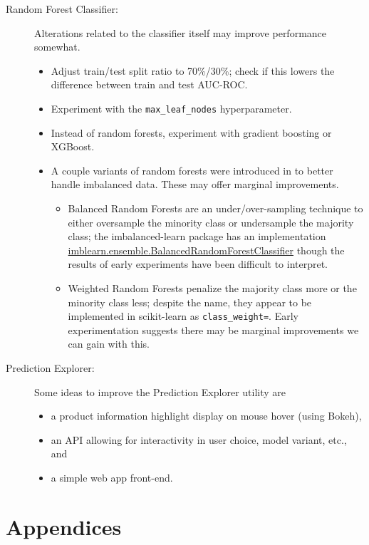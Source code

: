 \documentclass[11pt]{article}
\theoremstyle{definition}
\numberwithin{equation}{section}
\begin{document}
\begin{description}
\item[Random Forest Classifier:] Alterations related to the classifier itself may improve performance somewhat.
\begin{itemize}
\item Adjust train/test split ratio to 70\%/30\%; check if this lowers the difference between train and test AUC-ROC.
\item Experiment with the \texttt{max\_leaf\_nodes} hyperparameter.
\item Instead of random forests, experiment with gradient boosting or XGBoost.
\item A couple variants of random forests were introduced in \cite{chenUsingRandomForest2004} to better handle imbalanced data.
These may offer marginal improvements.
\begin{itemize}
\item Balanced Random Forests are an under/over-sampling technique to either 
oversample the minority class or undersample the majority class; 
the imbalanced-learn package has an implementation 
\href{https://imbalanced-learn.org/en/stable/generated/imblearn.ensemble.BalancedRandomForestClassifier.html#imblearn.ensemble.BalancedRandomForestClassifier}{imblearn.ensemble.BalancedRandomForestClassifier}
though the results of early experiments have been difficult to interpret.
\item Weighted Random Forests penalize the majority class more or the minority class less;
despite the name, they appear to be implemented in scikit-learn as 
\texttt{class\_weight=\textquotesingle{}}. Early experimentation suggests
there may be marginal improvements we can gain with this.
\end{itemize}
\end{itemize}

\item[Prediction Explorer:] Some ideas to improve the Prediction Explorer utility are
\begin{itemize}
\item a product information highlight display on mouse hover (using Bokeh),
\item an API allowing for interactivity in user choice, model variant, etc., and
\item a simple web app front-end.
\end{itemize}
\end{description}


\newpage

\hypertarget{appendices}{%
  \section{Appendices}\label{appendices}}
\end{document}
